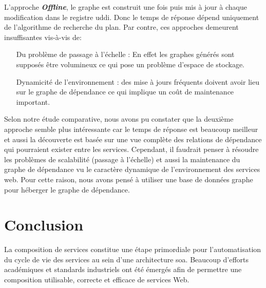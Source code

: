   L'approche \textbf{\textit{Offline}}, le graphe est construit une
  fois puis mis à jour à chaque modification dans le registre
  \acrshort{uddi}. Donc le temps de réponse dépend uniquement de
  l'algorithme de recherche du plan. Par contre, ces approches
  demeurent insuffisantes vis-à-vis de:\medskip

  \SpecialItem
  \begin{itemize}
  \item [Du problème de passage à l'échelle]: En effet les graphes
    générés sont supposés être volumineux ce qui pose un problème
    d'espace de stockage.

  \item [Dynamicité de l'environnement]: des mise à jours fréquents
    doivent avoir lieu sur le graphe de dépendance ce qui implique un
    coût de maintenance important.\bigskip

  \end{itemize}
  \enddescription

\newpage

\newpage


Selon notre étude comparative, nous avons pu constater que la deuxième
approche semble plus intéressante car le temps de réponse est beaucoup
meilleur et aussi la découverte est basée sur une vue complète des
relations de dépendance qui pourraient exister entre les services.
Cependant, il faudrait penser à résoudre les problèmes de scalabilité
(passage à l'échelle) et aussi la maintenance du graphe de dépendance
vu le caractère dynamique de l'environnement des services web.  Pour
cette raison, nous avons pensé à utiliser une base de données graphe
pour héberger le graphe de dépendance.

\section*{Conclusion}
\label{sec:conclusion}
 

La composition de services constitue une étape primordiale pour
l'automatisation du cycle de vie des services au sein d'une
architecture \acrshort{soa}. Beaucoup d'efforts académiques et
standards industriels ont été émergés afin de permettre une
composition utilisable, correcte et efficace de services Web.\medskip

